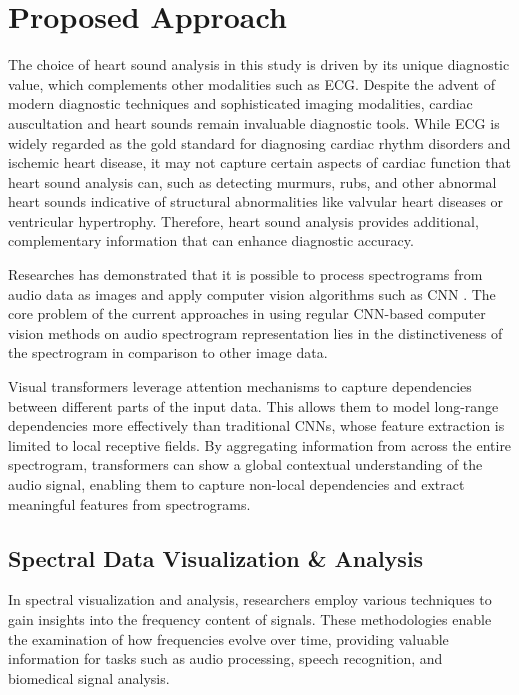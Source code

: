 \section{Proposed Approach} \label{proposed approach}
The choice of heart sound analysis in this study is driven by its unique diagnostic value, which complements other modalities such as ECG. Despite the advent of modern diagnostic techniques and sophisticated imaging modalities, cardiac auscultation and heart sounds remain invaluable diagnostic tools. While ECG is widely regarded as the gold standard for diagnosing cardiac rhythm disorders and ischemic heart disease, it may not capture certain aspects of cardiac function that heart sound analysis can, such as detecting murmurs, rubs, and other abnormal heart sounds indicative of structural abnormalities like valvular heart diseases or ventricular hypertrophy. Therefore, heart sound analysis provides additional, complementary information that can enhance diagnostic accuracy.

Researches has demonstrated that it is
possible to process spectrograms from audio data as images
and apply computer vision algorithms such as CNN \cite{verma_neural_2018, cabrera-ponce_detection_2020, hyder_acoustic_2017}. The core problem of the current approaches in using regular CNN-based computer vision methods on audio spectrogram representation lies in the distinctiveness of the spectrogram in comparison to other image data.

Visual transformers leverage attention mechanisms to capture dependencies between different parts of the input data. This allows them to model long-range dependencies more effectively than traditional CNNs, whose feature extraction is limited to local receptive fields. By aggregating information from across the entire spectrogram, transformers can show a global contextual understanding of the audio signal, enabling them to capture non-local dependencies and extract meaningful features from spectrograms.

\subsection{Spectral Data Visualization \& Analysis}
In spectral visualization and analysis, researchers employ various techniques to gain insights into the frequency content of signals. These methodologies enable the examination of how frequencies evolve over time, providing valuable information for tasks such as audio processing, speech recognition, and biomedical signal analysis.

